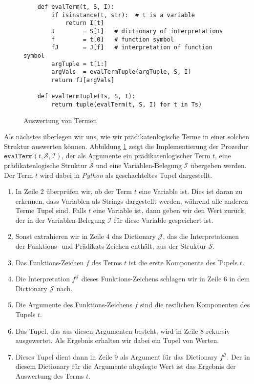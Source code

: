 \begin{figure}[!ht]
\centering
\begin{verbatim}
    def evalTerm(t, S, I):
        if isinstance(t, str):  # t is a variable
            return I[t]
        J        = S[1]   # dictionary of interpretations
        f        = t[0]   # function symbol
        fJ       = J[f]   # interpretation of function symbol
        argTuple = t[1:]
        argVals  = evalTermTuple(argTuple, S, I)
        return fJ[argVals]
        
    def evalTermTuple(Ts, S, I):
        return tuple(evalTerm(t, S, I) for t in Ts)    
\end{verbatim}
\vspace*{-0.3cm}
\caption{Auswertung von Termen}
\label{fig:evalTerm.ipynb}
\end{figure}


Als nächstes überlegen wir uns, wie wir prädikatenlogische Terme in einer solchen Struktur
auswerten können.  Abbildung \ref{fig:evalTerm.ipynb} zeigt die Implementierung der Prozedur
$\texttt{evalTerm}(t, \mathcal{S}, \mathcal{I})$, der als Argumente ein prädikatenlogischer Term $t$, eine
prädikatenlogische Struktur $\mathcal{S}$ und eine Variablen-Belegung $\mathcal{I}$ übergeben werden.  Der Term
$t$ wird dabei in \textsl{Python} als geschachteltes Tupel dargestellt.
\begin{enumerate}
\item In Zeile 2 überprüfen wir, ob der Term $t$ eine Variable ist.  Dies ist daran zu erkennen, dass Variablen
      als Strings dargestellt werden, während alle anderen Terme Tupel sind.  Falls $t$ eine Variable ist, dann 
      geben wir den Wert zurück, der in der Variablen-Belegung $\mathcal{I}$ für diese Variable gespeichert
      ist.
\item Sonst extrahieren wir in Zeile 4 das Dictionary $\mathcal{J}$, das die Interpretationen der Funktions- und
      Prädikats-Zeichen enthält, aus der Struktur $\mathcal{S}$.
\item Das Funktions-Zeichen $f$ des Terms $t$ ist die erste Komponente des Tupels $t$.
\item Die Interpretation $f^\mathcal{J}$ dieses Funktions-Zeichens schlagen wir in Zeile 6 in dem Dictionary
      $\mathcal{J}$ nach.
\item Die Argumente des Funktions-Zeichens $f$ sind die restlichen Komponenten des Tupels $t$.
\item Das Tupel, das aus diesen Argumenten besteht, wird in Zeile 8 rekursiv ausgewertet.
      Als Ergebnis erhalten wir dabei ein Tupel von Werten.
\item Dieses Tupel dient dann in Zeile 9 als Argument für das Dictionary $f^\mathcal{J}$.  Der in diesem
      Dictionary für die Argumente abgelegte Wert ist das Ergebnis der Auswertung des Terms $t$.
\end{enumerate}


